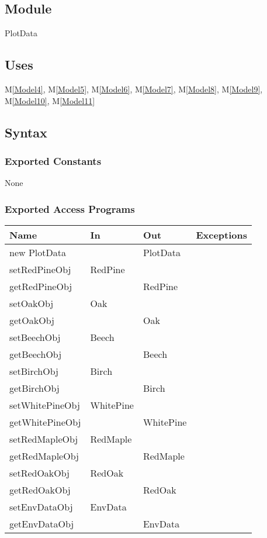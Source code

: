 \documentclass[12pt, titlepage]{article}
\newcommand{\mref}[1]{M\ref{#1}}
\begin{document}
\subsection{Module}
PlotData

\subsection{Uses}
\mref{Model4}, \mref{Model5}, \mref{Model6}, \mref{Model7},
\mref{Model8}, \mref{Model9}, \mref{Model10}, \mref{Model11}    

\subsection{Syntax}
\subsubsection{Exported Constants}
None
\subsubsection{Exported Access Programs}

\begin{center}
\begin{tabular}{|l|l|l| p{5cm}|}
\hline
\textbf{Name} & \textbf{In} & \textbf{Out} & \textbf{Exceptions} \\
\hline
new PlotData & & PlotData & \\
\hline

setRedPineObj & RedPine  & & \\
\hline
getRedPineObj & & RedPine & \\
\hline

setOakObj & Oak  & & \\
\hline
getOakObj & & Oak & \\
\hline

setBeechObj & Beech  & & \\
\hline
getBeechObj & & Beech & \\
\hline

setBirchObj & Birch  & & \\
\hline
getBirchObj & & Birch & \\
\hline

setWhitePineObj & WhitePine  & & \\
\hline
getWhitePineObj & & WhitePine & \\
\hline

setRedMapleObj & RedMaple  & & \\
\hline
getRedMapleObj & & RedMaple & \\
\hline

setRedOakObj & RedOak  & & \\
\hline
getRedOakObj & & RedOak & \\
\hline

setEnvDataObj & EnvData  & & \\
\hline
getEnvDataObj & & EnvData & \\
\hline

\end{tabular}
\end{center}
\end{document}
